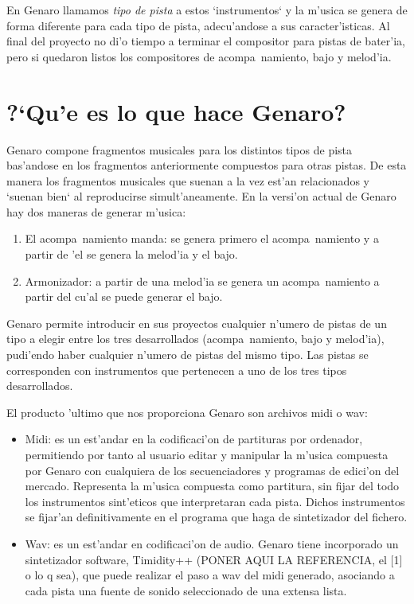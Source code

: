 \documentclass[a4paper,12pt]{article}
\begin{document}
En Genaro llamamos \emph{tipo de pista} a estos `instrumentos` y la m'usica se genera de forma diferente para cada tipo de pista, adecu'andose a sus caracter'isticas. Al final del proyecto no di'o tiempo a terminar el compositor para pistas de bater'ia, pero si quedaron listos los compositores de acompa~namiento, bajo y melod'ia.

\section{?`Qu'e es lo que hace Genaro?}
Genaro compone fragmentos musicales para los distintos tipos de pista bas'andose en los fragmentos anteriormente compuestos para otras pistas. De esta manera los fragmentos musicales que suenan a la vez est'an relacionados y `suenan bien` al reproducirse simult'aneamente. En la versi'on actual de Genaro hay dos maneras de generar m'usica:
\begin{enumerate}
\item El acompa~namiento manda: se genera primero el acompa~namiento y a partir de 'el se genera la melod'ia y el bajo.
\item Armonizador: a partir de una melod'ia se genera un acompa~namiento a partir del cu'al se puede generar el bajo.
\end{enumerate}

Genaro permite introducir en sus proyectos cualquier n'umero de pistas de un tipo a elegir entre los tres desarrollados (acompa~namiento, bajo y melod'ia), pudi'endo haber cualquier n'umero de pistas del mismo tipo. Las pistas se corresponden con instrumentos que pertenecen a uno de los tres tipos desarrollados.

El producto 'ultimo que nos proporciona Genaro son archivos midi o wav:
\begin{itemize}
\item Midi: es un est'andar en la codificaci'on de partituras por ordenador, permitiendo por tanto al usuario editar y manipular la m'usica compuesta por Genaro con cualquiera de los secuenciadores y programas de edici'on del mercado. Representa la m'usica compuesta como partitura, sin fijar del todo los instrumentos sint'eticos que interpretaran cada pista. Dichos instrumentos se fijar'an definitivamente en el programa que haga de sintetizador del fichero.
\item Wav: es un est'andar en codificaci'on de audio. Genaro tiene incorporado un sintetizador software, Timidity++ (PONER AQUI LA REFERENCIA, el [1] o lo q sea), que puede realizar el paso a wav del midi generado, asociando a cada pista una fuente de sonido seleccionado de una extensa lista.
\end{itemize}
\end{document}
